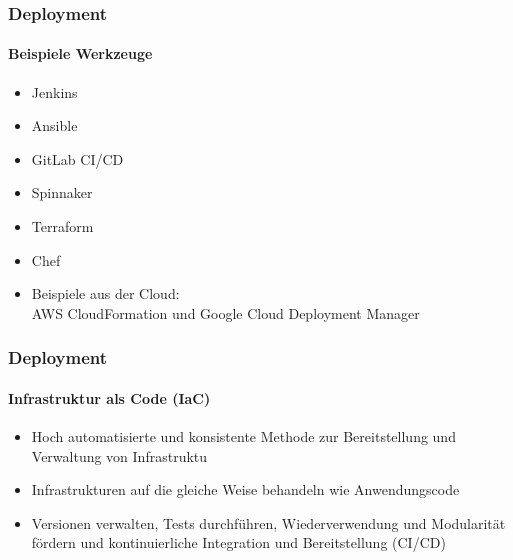 \begin{frame}
  \frametitle{Deployment}
  \framesubtitle{Beispiele Werkzeuge}
  \begin{itemize}
    \item Jenkins
    \item Ansible
    \item GitLab CI/CD
    \item Spinnaker
    \item Terraform
    \item Chef
    \item Beispiele aus der Cloud:\\ AWS CloudFormation und Google Cloud Deployment Manager
  \end{itemize}
\end{frame}

\begin{frame}
  \frametitle{Deployment}
  \framesubtitle{Infrastruktur als Code (IaC) }
  \begin{itemize}
    \item Hoch automatisierte und konsistente Methode zur Bereitstellung und Verwaltung von Infrastruktu
    \item Infrastrukturen auf die gleiche Weise behandeln wie Anwendungscode
    \item Versionen verwalten, Tests durchführen, Wiederverwendung und Modularität fördern und kontinuierliche Integration und Bereitstellung (CI/CD) 
  \end{itemize}
\end{frame}


